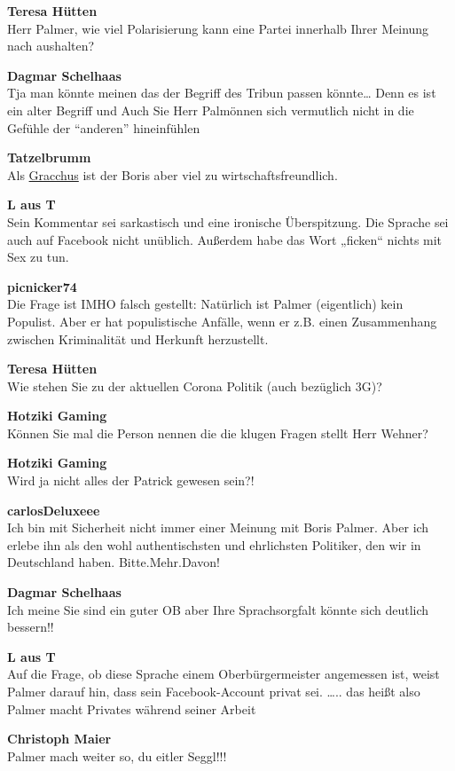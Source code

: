 \documentclass[]{article}
\begin{document}
\textbf{Teresa Hütten}\\
​Herr Palmer, wie viel Polarisierung kann eine Partei innerhalb Ihrer
Meinung nach aushalten?

\textbf{Dagmar Schelhaas}\\
​Tja man könnte meinen das der Begriff des Tribun passen könnte\ldots{}
Denn es ist ein alter Begriff und Auch Sie Herr Palmönnen sich
vermutlich nicht in die Gefühle der ``anderen'' hineinfühlen

\textbf{Tatzelbrumm}\\
​Als \protect\hyperlink{Gracchus}{Gracchus} ist der Boris aber viel zu
wirtschaftsfreundlich.

\textbf{L aus T}\\
​Sein Kommentar sei sarkastisch und eine ironische Überspitzung. Die
Sprache sei auch auf Facebook nicht unüblich. Außerdem habe das Wort
„ficken`` nichts mit Sex zu tun.

\textbf{picnicker74}\\
​Die Frage ist IMHO falsch gestellt: Natürlich ist Palmer (eigentlich)
kein Populist. Aber er hat populistische Anfälle, wenn er z.B. einen
Zusammenhang zwischen Kriminalität und Herkunft herzustellt.

\textbf{Teresa Hütten}\\
​Wie stehen Sie zu der aktuellen Corona Politik (auch bezüglich 3G)?

\textbf{Hotziki Gaming}\\
​Können Sie mal die Person nennen die die klugen Fragen stellt Herr
Wehner?

\textbf{Hotziki Gaming}\\
​Wird ja nicht alles der Patrick gewesen sein?!

\textbf{carlosDeluxeee}\\
​Ich bin mit Sicherheit nicht immer einer Meinung mit Boris Palmer. Aber
ich erlebe ihn als den wohl authentischsten und ehrlichsten Politiker,
den wir in Deutschland haben. Bitte.Mehr.Davon!

\textbf{Dagmar Schelhaas}\\
​Ich meine Sie sind ein guter OB aber Ihre Sprachsorgfalt könnte sich
deutlich bessern!!

\textbf{L aus T}\\
​Auf die Frage, ob diese Sprache einem Oberbürgermeister angemessen ist,
weist Palmer darauf hin, dass sein Facebook-Account privat sei.
\ldots{}.. das heißt also Palmer macht Privates während seiner Arbeit

\textbf{Christoph Maier}\\
​Palmer mach weiter so, du eitler Seggl!!!
\end{document}
